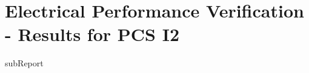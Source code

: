 \renewcommand{\DTRPcs}{I2} %
\renewcommand{\DTRPcsLong}{I2}


    \section{Electrical Performance Verification - Results for PCS \DTRPcsLong}

    {{subReport}}
    \newpage


